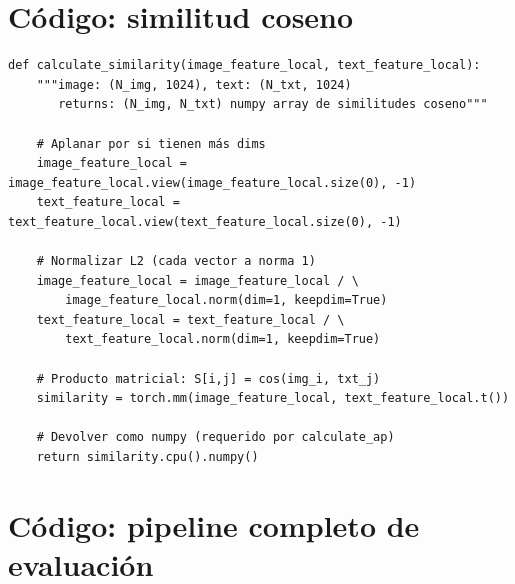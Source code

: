 \section{Código: similitud coseno}

\begin{verbatim}
def calculate_similarity(image_feature_local, text_feature_local):
    """image: (N_img, 1024), text: (N_txt, 1024)
       returns: (N_img, N_txt) numpy array de similitudes coseno"""

    # Aplanar por si tienen más dims
    image_feature_local = image_feature_local.view(image_feature_local.size(0), -1)
    text_feature_local = text_feature_local.view(text_feature_local.size(0), -1)

    # Normalizar L2 (cada vector a norma 1)
    image_feature_local = image_feature_local / \
        image_feature_local.norm(dim=1, keepdim=True)
    text_feature_local = text_feature_local / \
        text_feature_local.norm(dim=1, keepdim=True)

    # Producto matricial: S[i,j] = cos(img_i, txt_j)
    similarity = torch.mm(image_feature_local, text_feature_local.t())

    # Devolver como numpy (requerido por calculate_ap)
    return similarity.cpu().numpy()
\end{verbatim}

\section{Código: pipeline completo de evaluación}

